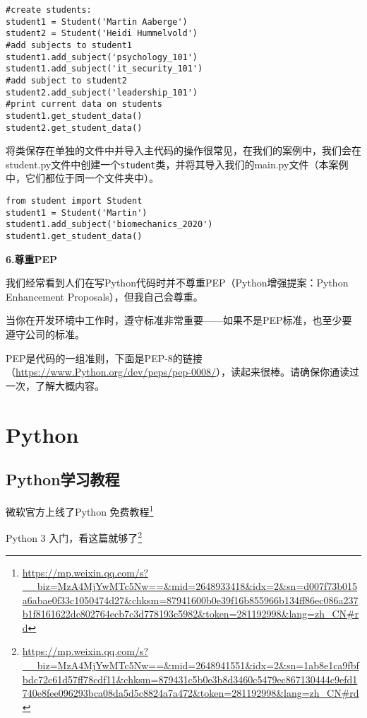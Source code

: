 \documentclass[]{ctexbook}
\renewcommand{\href}[2]{#2\footnote{\url{#1}}}
\begin{document}
\begin{verbatim}
#create students:
student1 = Student('Martin Aaberge')
student2 = Student('Heidi Hummelvold')
#add subjects to student1
student1.add_subject('psychology_101')
student1.add_subject('it_security_101')
#add subject to student2
student2.add_subject('leadership_101')
#print current data on students
student1.get_student_data()
student2.get_student_data()
\end{verbatim}

将类保存在单独的文件中并导入主代码的操作很常见，在我们的案例中，我们会在student.py文件中创建一个\texttt{student}类，并将其导入我们的main.py文件（本案例中，它们都位于同一个文件夹中）。

\begin{verbatim}
from student import Student
student1 = Student('Martin')
student1.add_subject('biomechanics_2020')
student1.get_student_data()
\end{verbatim}

\textbf{6.尊重PEP}

我们经常看到人们在写Python代码时并不尊重PEP（Python增强提案：Python Enhancement Proposals），但我自己会尊重。

当你在开发环境中工作时，遵守标准非常重要------如果不是PEP标准，也至少要遵守公司的标准。

PEP是代码的一组准则，下面是PEP-8的链接（\url{https://www.Python.org/dev/peps/pep-0008/}），读起来很棒。请确保你通读过一次，了解大概内容。

\hypertarget{python-1}{%
\section{Python}\label{python-1}}

\hypertarget{pythonux5b66ux4e60ux6559ux7a0b}{%
\subsection{Python学习教程}\label{pythonux5b66ux4e60ux6559ux7a0b}}

\href{https://mp.weixin.qq.com/s?__biz=MzA4MjYwMTc5Nw==\&mid=2648933418\&idx=2\&sn=d007f73b015a6abae0f33c1050474d27\&chksm=87941600b0e39f16b855966b134ff86ec086a237b1f8161622dc802764ecb7c3d778193c5982\&token=281192998\&lang=zh_CN\#rd}{微软官方上线了Python 免费教程}

\href{https://mp.weixin.qq.com/s?__biz=MzA4MjYwMTc5Nw==\&mid=2648941551\&idx=2\&sn=1ab8e1ca9fbfbdc72c61d57ff78cdf11\&chksm=879431c5b0e3b8d3460c5479ec867130444c9efd1740e8fee096293bca08da5d5c8824a7a472\&token=281192998\&lang=zh_CN\#rd}{Python 3 入门，看这篇就够了}
\end{document}
